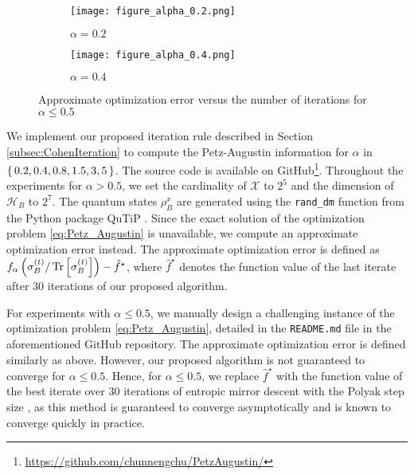 \documentclass{article}
\begin{document}
\begin{figure}[ht]
    \begin{subfigure}{.5\textwidth}
      \centering
      \texttt{[image: figure\_alpha\_0.2.png]}
      \caption{$\alpha=0.2$}
      \label{fig:sfig5}
    \end{subfigure}
    \begin{subfigure}{.5\textwidth}
      \centering
      \texttt{[image: figure\_alpha\_0.4.png]}
      \caption{$\alpha=0.4$}
      \label{fig:sfig6}
    \end{subfigure}
    \caption{Approximate optimization error versus the number of iterations for $\alpha\leq 0.5$}
    \label{fig2}
\end{figure}
We implement our proposed 
iteration rule 
described in Section \ref{subsec:CohenIteration} to compute the Petz-Augustin information for $\alpha$ in $\set{0.2,0.4,0.8,1.5,3,5}$. 
The source code is available on GitHub\footnote{\url{https://github.com/chunnengchu/PetzAugustin/}}.
Throughout the experiments for $\alpha>0.5$, we set the cardinality of $\mathcal{X}$ to $2^{5}$ and the dimension of $\mathcal{H}_B$ to $2^{7}$. 
The quantum states $ \rho_B^x $ are generated using the 
\texttt{rand\_dm}
function from the 
Python 
package QuTiP \citep{Johansson2012}.
Since the exact solution of the optimization problem \eqref{eq:Petz_Augustin} is unavailable, we compute an approximate optimization error instead. 
The approximate optimization error is defined as $f_{\alpha}\left(\sigma_B^{(t)}/\Tr\left[\sigma_B^{(t)}\right]\right)-\hat{f}^{\star}$, where $\hat{f}^\star$ denotes the function value of the last iterate after $30$ iterations of our proposed algorithm.

For experiments with $\alpha \leq 0.5$, we manually design a challenging instance of the optimization problem \eqref{eq:Petz_Augustin}, 
detailed in the \texttt{README.md} file in the 
aforementioned 
GitHub repository. 
The approximate optimization error is defined similarly as above. 
However, our proposed algorithm is not guaranteed to converge for $\alpha\leq 0.5$.
Hence, for $\alpha\leq 0.5$, we 
replace $\hat{f}^{\star}$ with 
the function value of the best iterate over $30$ iterations of entropic mirror descent with the Polyak step size \cite{You2022}, as this method is guaranteed to converge asymptotically and is known to converge quickly in practice.
\end{document}
